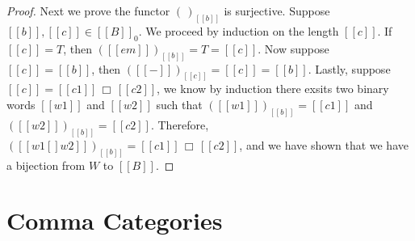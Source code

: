 \begin{proof}
  Next we prove the functor $(\,)_{[[b]]}$ is surjective. 
  Suppose $[[b]],[[c]] \in [[B]]_0$. We proceed by induction on the length $[[c]]$. 
  If $[[c]] = T$, then $([[em]])_{[[b]]} = T = [[c]]$.  Now suppose
  $[[c]] = [[b]]$, then $([[-]])_{[[c]]} = [[c]] = [[b]]$. Lastly, suppose $[[c]] = [[c1]]\,\Box\,[[c2]]$, we
  know by induction there exsits two binary words $[[w1]]$ and $[[w2]]$ such that $([[w1]])_{[[b]]} = [[c1]]$
  and $([[w2]])_{[[b]]} = [[c2]]$.  Therefore, $([[w1 [] w2]])_{[[b]]} = [[c1]]\,\Box\,[[c2]]$, and we have
  shown that we have a bijection from $W$ to $[[B]]$.  
\end{proof}

\section{Comma Categories}
\label{sec:comma_categories}

